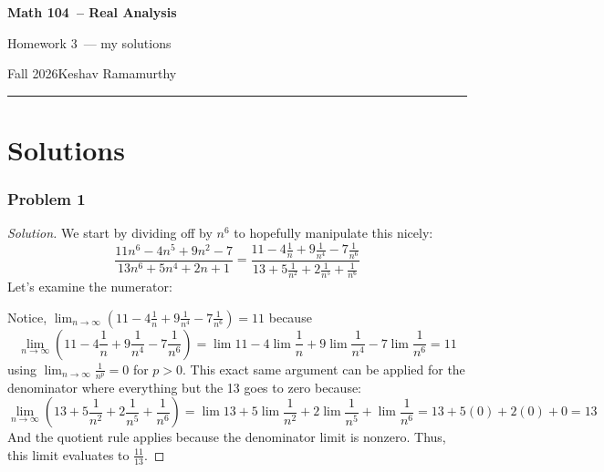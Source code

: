 \documentclass[11pt]{article}
\newcommand{\studentname}{Keshav Ramamurthy}
\newcommand{\coursename}{Math 104}
\newcommand{\courselongname}{Real Analysis}
\newcommand{\assignment}{Homework 3}
\newcommand{\term}{Fall 2026}
\newcommand{\1}{\mathbf{1}}
\theoremstyle{definition}
\newenvironment{solution}{\begin{proof}[Solution]}{\end{proof}}
\begin{document}
\begin{center}
  {\Large\sffamily\bfseries \coursename\ -- \courselongname}\par\vspace{3pt}
  {\sffamily \assignment\ — my solutions}\par\vspace{3pt}
  {\small\sffamily \term\quad\textbullet\quad \studentname}
\end{center}
\medskip
\hrule
\bigskip



\section*{Solutions}
\subsubsection*{Problem 1}
\begin{solution}
    We start by dividing off by $n^6$ to hopefully manipulate this nicely:
    $$\frac{11n^6-4n^5+9n^2-7}{13n^6+5n^4+2n+1} = \frac{11 - 4\frac{1}{n} +
        9\frac{1}{n^4} - 7\frac{1}{n^6}}{13 + 5\frac{1}{n^2} + 2\frac{1}{n^5} +
    \frac{1}{n^6}}$$
    Let's examine the numerator: 

    Notice, $\lim_{n\rightarrow\infty} \left(11 - 4\frac{1}{n} +
        9\frac{1}{n^4} - 7\frac{1}{n^6} \right)= 11$ because 
        $$\lim_{n\rightarrow\infty}\left(11 - 4\frac{1}{n} + 9\frac{1}{n^4} -
        7\frac{1}{n^6} \right) = \lim 11 -4 \lim\frac{1}{n} + 9\lim \frac{1}{n^4} - 7
        \lim \frac{1}{n^6} = 11  $$
    using $\lim_{n\rightarrow \infty}
    \frac{1}{n^p} = 0$ for $p > 0$.
    This exact same argument can be applied for the denominator where everything but the
    13 goes to zero because:
    $$\lim_{n\rightarrow\infty} \left(13 + 5\frac{1}{n^2} + 2 \frac{1}{n^5} + \frac{1}{n^6}\right) =
    \lim 13 + 5\lim \frac{1}{n^2} + 2\lim\frac{1}{n^5} + \lim \frac{1}{n^6} = 13 +
    5(0) + 2(0) + 0 = 13$$
    And the quotient rule applies because the denominator limit is nonzero.
    Thus, this limit evaluates to $\frac{11}{13}$.
\end{solution}
\end{document}
